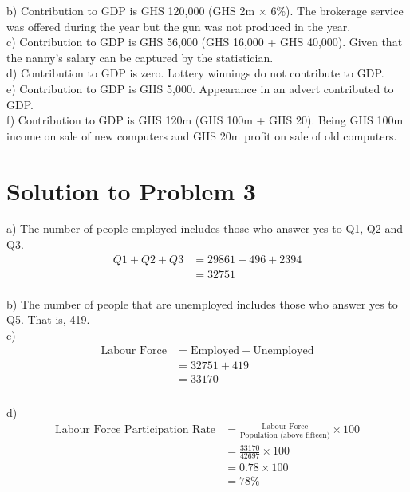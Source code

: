 \documentclass[12pt]{article}
\begin{document}
b) Contribution to GDP is GHS 120,000 (GHS 2m $\times$ 6\%). The brokerage service was offered during the year but the gun was not produced in the year.
\\

c) Contribution to GDP is  GHS 56,000 (GHS 16,000 + GHS 40,000). Given that the nanny's salary can be captured by the statistician.
\\

d) Contribution to GDP is zero. Lottery winnings do not contribute to GDP.
\\

e) Contribution to GDP is GHS 5,000. Appearance in an advert contributed to GDP.
\\

f) Contribution to GDP is GHS 120m (GHS 100m + GHS 20). Being GHS 100m income on sale of new computers and GHS 20m profit on sale of old computers.
\\
\vspace{0.5cm}

\section*{Solution to Problem 3}
a) The number of people employed includes those who answer yes to Q1, Q2 and Q3.
\begin{align*}
	Q1 + Q2 + Q3 &= 29861 + 496 + 2394\\
	&= 32751\\
\end{align*}

b) The number of people that are unemployed includes those who answer yes to Q5. That is, 419.\\

c) \begin{align*}
	\text{Labour Force} &= \text{Employed} + \text{Unemployed}\\
	&= 32751 + 419\\
	&= 33170\\
\end{align*}\\

d) \begin{align*}
	\text{Labour Force Participation Rate} &= \frac{\text{Labour Force}}{\text{Population (above fifteen)}} \times 100\\
	&= \frac{33170}{42697} \times 100\\
	&= 0.78 \times 100\\
	&= 78\%\\
	\end{align*}\\
	
\end{document}
